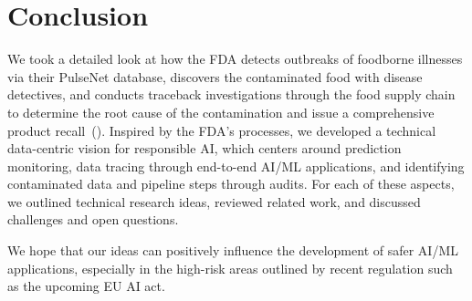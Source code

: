 \section{Conclusion}

We took a detailed look at how the FDA detects outbreaks of foodborne illnesses via their PulseNet database, discovers the contaminated food with disease detectives, and conducts traceback investigations through the food supply chain to determine the root cause of the contamination and issue a comprehensive product recall~().
%
Inspired by the FDA's processes, we developed a technical data-centric vision for responsible AI, which centers around prediction monitoring, data tracing through end-to-end AI/ML applications, and identifying contaminated data and pipeline steps through audits. For each of these aspects, we outlined technical research ideas, reviewed related work, and discussed challenges and open questions.

We hope that our ideas can positively influence the development of safer AI/ML applications, especially in the high-risk areas outlined by recent regulation such as the upcoming EU AI act. 

